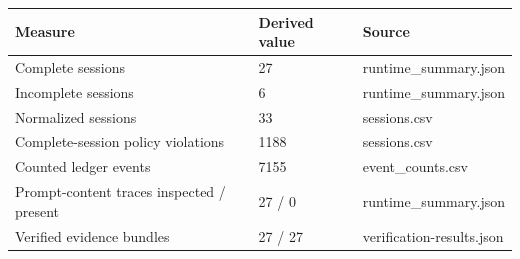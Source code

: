 \begin{tabularx}{\linewidth}{@{}XXX@{}}
\toprule
Measure & Derived value & Source \\
\midrule
Complete sessions & 27 & runtime\_summary.json \\
Incomplete sessions & 6 & runtime\_summary.json \\
Normalized sessions & 33 & sessions.csv \\
Complete-session policy violations & 1188 & sessions.csv \\
Counted ledger events & 7155 & event\_counts.csv \\
Prompt-content traces inspected / present & 27 / 0 & runtime\_summary.json \\
Verified evidence bundles & 27 / 27 & verification-results.json \\
\bottomrule
\end{tabularx}
